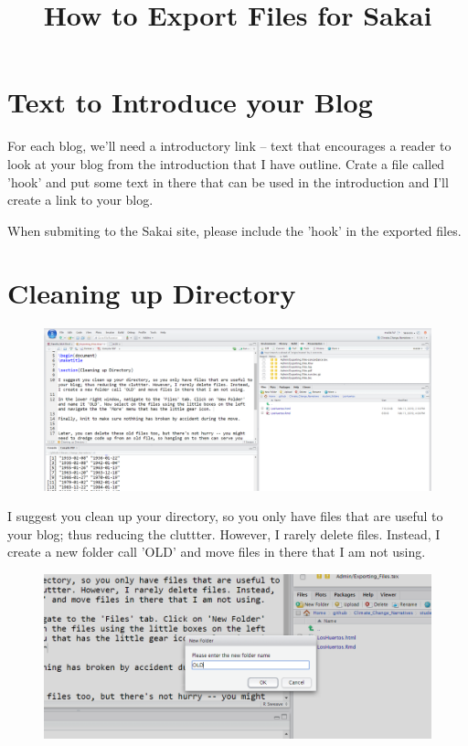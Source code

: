 \documentclass{article}\usepackage[]{graphicx}\usepackage[]{color}
\title{How to Export Files for Sakai}
\begin{document}
\maketitle

\section{Text to Introduce your Blog}

For each blog, we'll need a introductory link -- text that encourages a reader to look at your blog from the introduction that I have outline. Crate a file called 'hook' and put some text in there that can be used in the introduction and I'll create a link to your blog. 

When submiting to the Sakai site, please include the 'hook' in the exported files.  

\section{Cleaning up Directory}

\begin{figure}
\includegraphics[width=\textwidth]{FourWindows}
\end{figure}

I suggest you clean up your directory, so you only have files that are useful to your blog; thus reducing the cluttter. However, I rarely delete files. Instead, I create a new folder call 'OLD' and move files in there that I am not using.

\begin{figure}
\includegraphics[width=\textwidth]{CreateFolder}
\end{figure}
\end{document}
